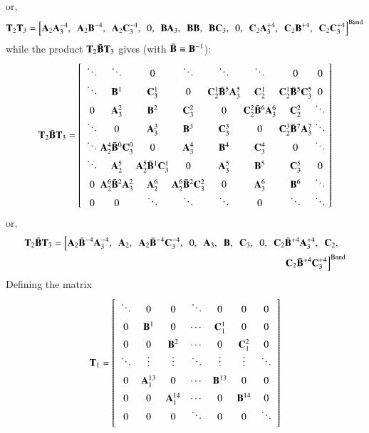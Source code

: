 \documentclass{warpdoc}
\newcommand{\alb}{\vspace{0.2cm}\\} %
\newcommand{\B}{{\bf B}}
\newcommand{\BI}{\wbar{{\bf B}}}
\newcommand{\A}{{\bf A}}
\newcommand{\C}{{\bf C}}
\newcommand{\T}{{\bf T}}
\newcommand{\co}{,~~}
\newcommand{\band}{{\rm Band}}
\begin{document}
%
or,
%
\begin{equation}
\T_2 \T_3=\left[
 \A_2 \A_3^{-4} \co
 \A_2 \B^{-4} \co
 \A_2 \C_3^{-4} \co
 0 \co
 \B \A_3     \co
 \B \B   \co
 \B \C_3 \co
 0 \co
 \C_2 \A_3^{+4} \co
 \C_2 \B^{+4} \co
 \C_2 \C_3^{+4}
\right]^\band
\end{equation}
%
while the product $\T_2 \BI \T_3$ gives (with $\BI \equiv \B^{-1}$):
%
\begin{equation}
\T_2 \BI \T_3=
 \left[
   \begin{array}{c@{\;}c@{\;}c@{\;}c@{\;}c@{\;}c@{\;}c@{\;}c@{\;}c@{\;}c@{\;}c@{\;}c@{\;}c@{\;}c}
     \ddots  & \ddots  & 0     & \ddots     & \ddots   & \ddots   & 0        & 0 \\
     \ddots  & \B^1     & \C_3^1 & 0         & \C_2^1 \BI^5 \A_3^5& \C_2^1     & \C_2^1 \BI^5 \C_3^5 & 0 \\
     0     & \A_3^2  & \B^2   & \C_3^2     & 0      & \C_2^2 \BI^6 \A_3^6   & \C_2^2  & \ddots  \\
     \ddots  &  0     & \A_3^3 & \B^3       & \C_3^3  & 0         & \C_2^3 \BI^7 \A_3^7 & \ddots \\
     \ddots  & \A_2^4 \BI^0 \C_3^0& 0     &  \A_3^4     &  \B^4    &  \C_3^4     & 0      & \ddots  \\
     \ddots  & \A_2^5  & \A_2^5 \BI^1 \C_3^1& 0     & \A_3^5     & \B^5    & \C_3^5     & 0  \\
     0     & \A_2^6 \BI^2 \A_3^2& \A_2^6  & \A_2^6 \BI^2 \C_3^2& 0     &  \A_3^6     & \B^6       & \ddots \\
     0     &  0    & \ddots   & \ddots  & \ddots   & 0     & \ddots    & \ddots \\
   \end{array}
 \right]
\end{equation}
%
or,
%
\begin{align}
\T_2 \BI \T_3=\left[
 \A_2 \BI^{-4} \A_3^{-4} \co
 \A_2 \co
 \A_2 \BI^{-4} \C_3^{-4} \co
 0 \co
 \A_3     \co
 \B    \co
 \C_3 \co
 0 \co
 \C_2 \BI^{+4} \A_3^{+4} \co
 \C_2 \co \right.\nonumber\alb
\left.
 \C_2 \BI^{+4} \C_3^{+4}
\right]^\band
\end{align}
%
Defining the matrix
%
\begin{equation}
\T_1=
 \left[
   \begin{array}{ccccccccccccccc}
   \ddots &0       & 0    &\ddots    &0    & 0    & 0     \alb
   0    &\B^1      & 0    &\cdots    &\C_1^1 & 0    & 0     \alb
   0    &0       & \B^2   &\cdots    &0    & \C_1^2 & 0     \\
   \ddots &\vdots    & \vdots &\ddots    &\vdots & \vdots & \ddots  \alb
   0    &\A_1^{13} & 0    &\cdots    &\B^{13}& 0    & 0     \alb
   0    &0       &\A_1^{14}& \cdots  &0    &\B^{14} & 0     \\
   0    &0       &0     &\ddots    &0    &0     &\ddots   \alb
   \end{array}
 \right]
\end{equation}
\end{document}
